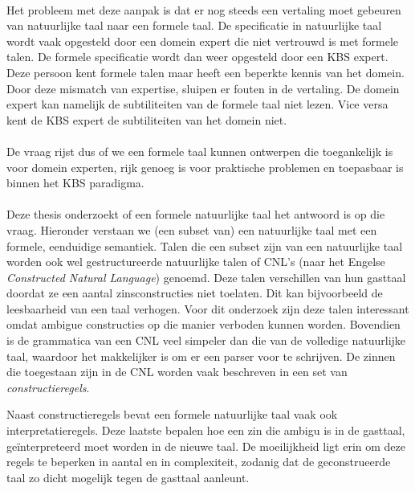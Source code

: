 \paragraph{} Het probleem met deze aanpak is dat er nog steeds een vertaling moet gebeuren van natuurlijke taal naar een formele taal. De specificatie in natuurlijke taal wordt vaak opgesteld door een domein expert die niet vertrouwd is met formele talen. De formele specificatie wordt dan weer opgesteld door een KBS expert. Deze persoon kent formele talen maar heeft een beperkte kennis van het domein. Door deze mismatch van expertise, sluipen er fouten in de vertaling. De domein expert kan namelijk de subtiliteiten van de formele taal niet lezen. Vice versa kent de KBS expert de subtiliteiten van het domein niet.

\paragraph{} De vraag rijst dus of we een formele taal kunnen ontwerpen die toegankelijk is voor domein experten, rijk genoeg is voor praktische problemen en toepasbaar is binnen het KBS paradigma.

\paragraph{} Deze thesis onderzoekt of een formele natuurlijke taal het antwoord is op die vraag. Hieronder verstaan we (een subset van) een natuurlijke taal met een formele, eenduidige semantiek. Talen die een subset zijn van een natuurlijke taal worden ook wel gestructureerde natuurlijke talen of CNL's (naar het Engelse \textit{Constructed Natural Language}) genoemd. Deze talen verschillen van hun gasttaal doordat ze een aantal zinsconstructies niet toelaten. Dit kan bijvoorbeeld de leesbaarheid van een taal verhogen. Voor dit onderzoek zijn deze talen interessant omdat ambigue constructies op die manier verboden kunnen worden. Bovendien is de grammatica van een CNL veel simpeler dan die van de volledige natuurlijke taal, waardoor het makkelijker is om er een parser voor te schrijven. De zinnen die toegestaan zijn in de CNL worden vaak beschreven in een set van \textit{constructieregels}.

Naast constructieregels bevat een formele natuurlijke taal vaak ook interpretatieregels. Deze laatste bepalen hoe een zin die ambigu is in de gasttaal, geïnterpreteerd moet worden in de nieuwe taal. De moeilijkheid ligt erin om deze regels te beperken in aantal en in complexiteit, zodanig dat de geconstrueerde taal zo dicht mogelijk tegen de gasttaal aanleunt.

